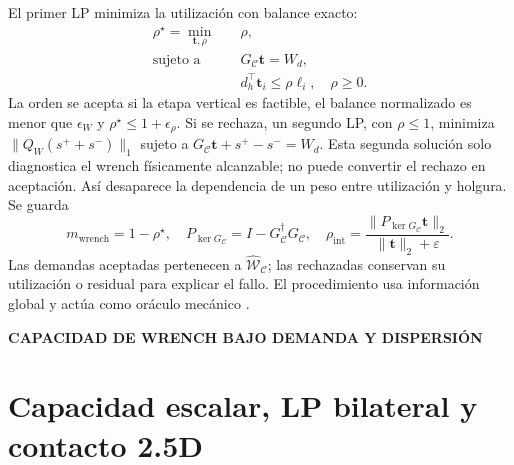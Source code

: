 \documentclass[12pt,a4paper]{article}
\newcommand{\leveltag}[1]{%
  \Needspace{5.5\baselineskip}%
  \noindent\colorbox{VIUDark}{%
    \parbox{\dimexpr\textwidth-2\fboxsep\relax}{%
      \color{white}\sffamily\bfseries\small #1%
    }%
  }\par\smallskip
}
\begin{document}
El primer LP minimiza la utilización con balance exacto:
\begin{equation}
\begin{aligned}
\rho^\star=\min_{\mathbf t,\rho}\quad &\rho,\\
\text{sujeto a}\quad &G_{\mathcal C}\mathbf t=W_d,\\
&d_h^\top\mathbf t_i\leq\rho\ell_i,\quad \rho\geq0.
\end{aligned}
\label{eq:wrench-allocation}
\end{equation}
La orden se acepta si la etapa vertical es factible, el balance normalizado es
menor que $\epsilon_W$ y $\rho^\star\leq1+\epsilon_\rho$. Si se rechaza, un
segundo LP, con $\rho\leq1$, minimiza
$\|Q_W(s^++s^-)\|_1$ sujeto a
$G_{\mathcal C}\mathbf t+s^+-s^-=W_d$. Esta segunda solución solo diagnostica
el wrench físicamente alcanzable; no puede convertir el rechazo en aceptación.
Así desaparece la dependencia de un peso entre utilización y holgura. Se guarda
\[
m_{\mathrm{wrench}}=1-\rho^\star,
\quad P_{\ker G_{\mathcal C}}=I-G_{\mathcal C}^{\dagger}G_{\mathcal C},
\quad \rho_{\mathrm{int}}=
\frac{\|P_{\ker G_{\mathcal C}}\mathbf t\|_2}{\|\mathbf t\|_2+\varepsilon}.
\]
Las demandas aceptadas pertenecen a $\widehat{\mathcal W}_{\mathcal C}$; las rechazadas
conservan su utilización o residual para explicar el fallo. El procedimiento usa
información global y actúa como oráculo mecánico
\parencite{nakamura1989dynamics,yoshikawa1993coordinated}.

\leveltag{CAPACIDAD DE WRENCH BAJO DEMANDA Y DISPERSIÓN}
\section*{Capacidad escalar, LP bilateral y contacto 2.5D}
\end{document}

